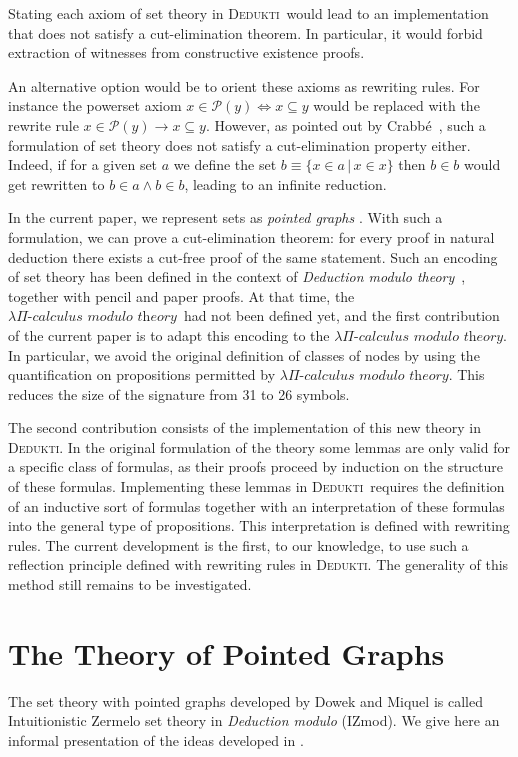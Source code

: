 \documentclass[submission,copyright,creativecommons]{eptcs}
\def\lra{\longrightarrow}
\newcommand{\dedukti}{\textsc{Dedukti}}
\newcommand{\lpcm}{$\lambda \Pi\textit{-calculus modulo theory}$}
\begin{document}
Stating each axiom of set theory in \dedukti ~would lead to an implementation that does not satisfy a cut-elimination theorem. In particular, it would forbid extraction of witnesses from constructive existence proofs.

An alternative option would be to orient these axioms as rewriting rules. For instance the powerset axiom $x \in \mathcal{P}(y) \Leftrightarrow x \subseteq y$ would be replaced with the rewrite rule $x \in \mathcal{P}(y) \lra x \subseteq y$. However, as pointed out by Crabbé~\cite{crabbe}, such a formulation of set theory does not satisfy a cut-elimination property either. Indeed, if for a given set $a$ we define the set $b\equiv\{x\in a\,|\,x\in x\}$ then $b\in b$ would get rewritten to $b\in a\wedge b\in b$, leading to an infinite reduction.

In the current paper, we represent sets as \textit{pointed graphs} \cite{pointed}. With such a formulation, we can prove a cut-elimination theorem: for every proof in natural deduction there exists a cut-free proof of the same statement. Such an encoding of set theory has been defined in the context of \textit{Deduction modulo theory}~\cite{zermodulo}, together with pencil and paper proofs. At that time, the \lpcm ~had not been defined yet, and the first contribution of the current paper is to adapt this encoding to the \lpcm. In particular, we avoid the original definition of classes of nodes by using the quantification on propositions permitted by \lpcm. This reduces the size of the signature from 31 to 26 symbols.

The second contribution consists of the implementation of this new theory in \dedukti. In the original formulation of the theory some lemmas are only valid for a specific class of formulas, as their proofs proceed by induction on the structure of these formulas. Implementing these lemmas in \dedukti ~requires the definition of an inductive sort of formulas together with an interpretation of these formulas into the general type of propositions. This interpretation is defined with rewriting rules. The current development is the first, to our knowledge, to use such a reflection principle defined with rewriting rules in \dedukti. The generality of this method still remains to be investigated.

\section{The Theory of Pointed Graphs}

The set theory with pointed graphs developed by Dowek and Miquel is called Intuitionistic Zermelo set theory in \textit{Deduction modulo} (IZmod). We give here an informal presentation of the ideas developed in \cite{zermodulo}.
\end{document}
